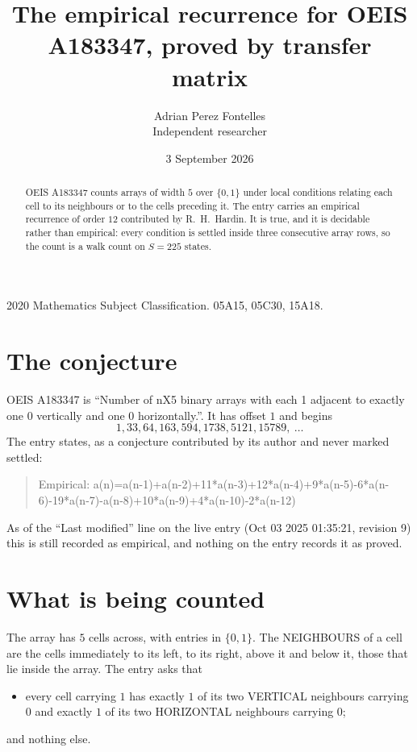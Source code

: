 \documentclass[11pt,a4paper]{article}
\title{The empirical recurrence for OEIS A183347, proved by transfer matrix}
\author{Adrian Perez Fontelles\\ \small Independent researcher}
\date{3 September 2026}
\theoremstyle{plain}
\theoremstyle{definition}
\begin{document}
\maketitle

\begin{abstract}
OEIS A183347 counts arrays of width $5$ over $\{0,1\}$ under local conditions relating each cell
to its neighbours or to the cells preceding it. The entry carries an empirical recurrence of
order $12$ contributed by R.~H.~Hardin. It is true, and it is decidable rather than
empirical: every condition is settled inside three consecutive array rows, so the count is a
walk count on $S=225$ states.
\end{abstract}

\noindent\small 2020 Mathematics Subject Classification. 05A15, 05C30, 15A18.\normalsize

\section{The conjecture}

OEIS A183347 is ``Number of nX5 binary arrays with each 1 adjacent to exactly one 0 vertically and one 0 horizontally.''. It has offset $1$ and begins
\[
1, 33, 64, 163, 594, 1738, 5121, 15789,\ \dots
\]
The entry states, as a conjecture contributed by its author and never marked settled:
\begin{quote}
Empirical: a(n)=a(n-1)+a(n-2)+11*a(n-3)+12*a(n-4)+9*a(n-5)-6*a(n-6)-19*a(n-7)-a(n-8)+10*a(n-9)+4*a(n-10)-2*a(n-12)
\end{quote}
As of the ``Last modified'' line on the live entry (Oct 03 2025 01:35:21, revision 9) this is still
recorded as empirical, and nothing on the entry records it as proved.

\section{What is being counted}

The array has $5$ cells across, with entries in $\{0,1\}$. The NEIGHBOURS of a cell are the
cells immediately to its left, to its right, above it and below it, those that lie inside the
array. The entry asks that
\begin{itemize}
\item every cell carrying $1$ has exactly $1$ of its two VERTICAL neighbours carrying $0$ and exactly $1$ of its two HORIZONTAL neighbours carrying $0$;
\end{itemize}
and nothing else.
\end{document}
